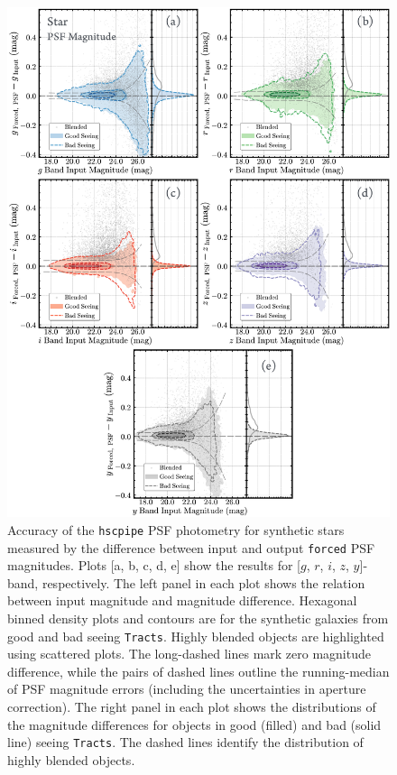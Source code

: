 \documentclass[useamsfonts]{pasj01}
\def\forced{\texttt{forced}}
\def\tracts{\texttt{Tracts}}
\begin{document}
\begin{figure}
    \begin{center}
        \includegraphics[width=16cm]{fig/synpipe_psf_mag}
    \end{center}
    \caption{
        Accuracy of the \texttt{hscpipe} PSF photometry for synthetic stars measured
        by the difference between input and output \forced{} PSF magnitudes.
        Plots [a, b, c, d, e] show the results for [$g$, $r$, $i$, $z$, $y$]-band, 
        respectively.
        The left panel in each plot shows the relation between input magnitude and
        magnitude difference.
        Hexagonal binned density plots and contours are for the synthetic galaxies 
        from good and bad seeing \tracts{}.
        Highly blended objects are highlighted using scattered plots.
        The long-dashed lines mark zero magnitude difference, while the pairs of
        dashed lines outline the running-median of PSF magnitude errors
        (including the uncertainties in aperture correction).
        The right panel in each plot shows the distributions of the magnitude 
        differences for objects in good (filled) and bad (solid line) seeing \tracts{}.
        The dashed lines identify the distribution of highly blended objects.
        }
    \label{fig:psf_mag}
\end{figure}
\end{document}
